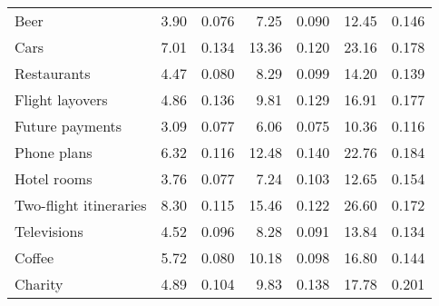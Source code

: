 \begin{tabular}[t]{lrrrrrr}
Beer & 3.90 & 0.076 & 7.25 & 0.090 & 12.45 & 0.146\\
Cars & 7.01 & 0.134 & 13.36 & 0.120 & 23.16 & 0.178\\
Restaurants & 4.47 & 0.080 & 8.29 & 0.099 & 14.20 & 0.139\\
\addlinespace
Flight layovers & 4.86 & 0.136 & 9.81 & 0.129 & 16.91 & 0.177\\
Future payments & 3.09 & 0.077 & 6.06 & 0.075 & 10.36 & 0.116\\
Phone plans & 6.32 & 0.116 & 12.48 & 0.140 & 22.76 & 0.184\\
Hotel rooms & 3.76 & 0.077 & 7.24 & 0.103 & 12.65 & 0.154\\
Two-flight itineraries & 8.30 & 0.115 & 15.46 & 0.122 & 26.60 & 0.172\\
\addlinespace
Televisions & 4.52 & 0.096 & 8.28 & 0.091 & 13.84 & 0.134\\
Coffee & 5.72 & 0.080 & 10.18 & 0.098 & 16.80 & 0.144\\
Charity & 4.89 & 0.104 & 9.83 & 0.138 & 17.78 & 0.201\\
\bottomrule
\end{tabular}

